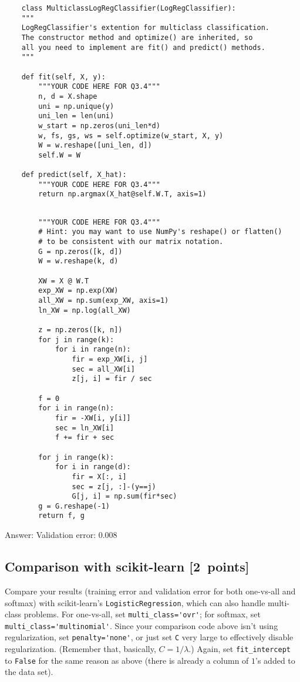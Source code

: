 \documentclass{article}
\newcommand{\blu}[1]{{\textcolor{blu}{#1}}}
\newenvironment{answer}{\par\begingroup\color{gre}Answer: }{\endgroup}
\let\ask\blu
\newcommand\pts[1]{\textcolor{pointscolour}{[#1~points]}}
\begin{document}
\begin{verbatim}
    class MulticlassLogRegClassifier(LogRegClassifier):
    """
    LogRegClassifier's extention for multiclass classification.
    The constructor method and optimize() are inherited, so
    all you need to implement are fit() and predict() methods.
    """

    def fit(self, X, y):
        """YOUR CODE HERE FOR Q3.4"""
        n, d = X.shape
        uni = np.unique(y)
        uni_len = len(uni)
        w_start = np.zeros(uni_len*d)
        w, fs, gs, ws = self.optimize(w_start, X, y)
        W = w.reshape([uni_len, d])
        self.W = W

    def predict(self, X_hat):
        """YOUR CODE HERE FOR Q3.4"""
        return np.argmax(X_hat@self.W.T, axis=1)
    
\end{verbatim}

\begin{verbatim}
        """YOUR CODE HERE FOR Q3.4"""
        # Hint: you may want to use NumPy's reshape() or flatten()
        # to be consistent with our matrix notation.
        G = np.zeros([k, d])
        W = w.reshape(k, d)
        
        XW = X @ W.T 
        exp_XW = np.exp(XW) 
        all_XW = np.sum(exp_XW, axis=1)  
        ln_XW = np.log(all_XW)  
        
        z = np.zeros([k, n])
        for j in range(k):
            for i in range(n):
                fir = exp_XW[i, j]
                sec = all_XW[i]
                z[j, i] = fir / sec 

        f = 0
        for i in range(n):
            fir = -XW[i, y[i]]
            sec = ln_XW[i]
            f += fir + sec

        for j in range(k):
            for i in range(d):
                fir = X[:, i]
                sec = z[j, :]-(y==j)
                G[j, i] = np.sum(fir*sec)
        g = G.reshape(-1)
        return f, g
\end{verbatim}

\begin{answer}
    Validation error: 0.008
\end{answer}

\subsection{Comparison with scikit-learn \pts{2}}
\ask{Compare your results (training error and validation error for both one-vs-all and softmax) with scikit-learn's \texttt{LogisticRegression}},
which can also handle multi-class problems.
For one-vs-all, set \verb|multi_class='ovr'|; for softmax, set \verb|multi_class='multinomial'|.
Since your comparison code above isn't using regularization, set \verb|penalty='none'|, or just set \verb|C| very large to effectively disable regularization.
(Remember that, basically, $C = 1 / \lambda$.)
Again, set \verb|fit_intercept| to \verb|False| for the same reason as above (there is already a column of $1$'s added to the data set).
\end{document}
